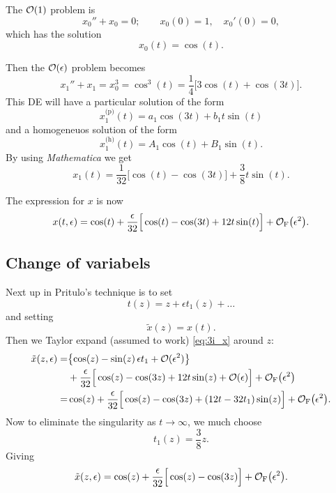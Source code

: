 \documentclass[11pt,letter, swedish, english
]{article}
\begin{document}
The $\order{1}$ problem is 
\begin{equation}
x_0''+x_0=0;\qquad
x_0(0)=1,\quad {x_0'}(0)=0,
\end{equation}
which has the solution
\begin{equation}
x_0(t)=\cos(t).
\end{equation}

Then the $\order{\epsilon}$ problem becomes
\begin{equation}
x_1''+x_1=x_0^3=\cos^3(t)=\frac{1}{4}
\Big[3\cos(t)+\cos(3t)\Big].
\end{equation}
This DE will have a particular solution of the form
\begin{equation}
x_1^\text{(p)}(t)=a_1\cos(3t)+b_1t\sin(t)
\end{equation}
and a homogeneuos solution of the form
\begin{equation}
x_1^\text{(h)}(t)=A_1\cos(t)+B_1\sin(t).
\end{equation}
By using \textit{Mathematica} we get
\begin{equation}
x_1(t)=\frac{1}{32}\Big[\cos(t)-\cos(3t) \Big] + \frac{3}{8}t\sin(t).
\end{equation}

The expression for $x$ is now
\begin{equation}\label{eq:3i_x}
x(t,\epsilon)=\cos(t)+
\frac{\epsilon}{32}\Big[\cos(t)-\cos(3t)+ 12t\sin(t) \Big]
+\mathcal{O}_\text{F}\qty(\epsilon^2).
\end{equation}

\subsection{Change of variabels}
Next up in Pritulo's technique is to set
\begin{equation}
t(z)=z+\epsilon t_1(z)+\ldots
\end{equation}
and setting
\begin{equation}
\tilde{x}(z)=x(t).
\end{equation}
Then we Taylor expand (assumed to work) \eqref{eq:3i_x} around $z$:
\begin{equation}
\begin{aligned}
\tilde{x}(z,\epsilon)=&\qty{\cos(z)-\sin(z)\,\epsilon t_1
+\order*{\epsilon^2}}\\
&+\frac{\epsilon}{32}\Big[\cos(z)-\cos(3z)+ 12t\sin(z)
+\order*{\epsilon} \Big]
+\mathcal{O}_\text{F}\qty(\epsilon^2)\\
=&\cos(z)
+\frac{\epsilon}{32}\Big[\cos(z)-\cos(3z)+ (12t-32t_1)\sin(z)
\Big]
+\mathcal{O}_\text{F}\qty(\epsilon^2).
\end{aligned}
\end{equation}
Now to eliminate the singularity as $t\to\infty$, we much choose
\begin{equation}
t_1(z)=\frac{3}{8}z.
\end{equation}
Giving
\begin{equation}
\tilde{x}(z,\epsilon)=\cos(z)
+\frac{\epsilon}{32}\Big[\cos(z)-\cos(3z)\Big]
+\mathcal{O}_\text{F}\qty(\epsilon^2).
\end{equation}
\end{document}
